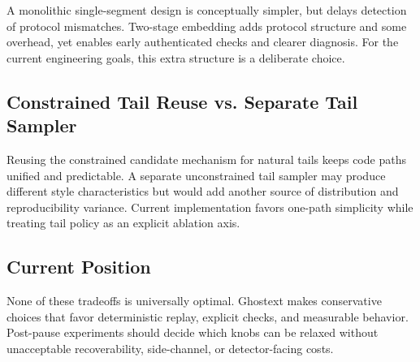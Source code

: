 A monolithic single-segment design is conceptually simpler, but delays detection of protocol mismatches. Two-stage embedding adds protocol structure and some overhead, yet enables early authenticated checks and clearer diagnosis. For the current engineering goals, this extra structure is a deliberate choice.

\subsection{Constrained Tail Reuse vs. Separate Tail Sampler}

Reusing the constrained candidate mechanism for natural tails keeps code paths unified and predictable. A separate unconstrained tail sampler may produce different style characteristics but would add another source of distribution and reproducibility variance. Current implementation favors one-path simplicity while treating tail policy as an explicit ablation axis.

\subsection{Current Position}

None of these tradeoffs is universally optimal. Ghostext makes conservative choices that favor deterministic replay, explicit checks, and measurable behavior. Post-pause experiments should decide which knobs can be relaxed without unacceptable recoverability, side-channel, or detector-facing costs.
